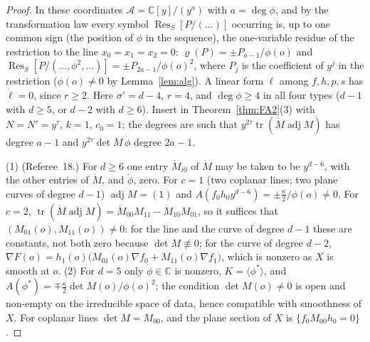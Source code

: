 \documentclass[11pt]{article}
\numberwithin{equation}{section}
\theoremstyle{remark}
\newcommand{\CC}{\mathbb{C}}
\newcommand{\cA}{\mathcal{A}}
\newcommand{\Res}{\operatorname{Res}}
\begin{document}
\begin{proof}
In these coordinates $\cA=\CC[y]/(y^a)$ with $a=\deg\phi$, and by the transformation law every symbol
$\Res_S[P/(\dots)]$ occurring is, up to one common sign (the position of $\phi$ in the sequence), the
one-variable residue of the restriction to the line $x_0=x_1=x_2=0$: $\varrho(P)=\pm P_{a-1}/\phi(o)$
and $\Res_S[P/(\dots,\phi^2,\dots)]=\pm P_{2a-1}/\phi(o)^2$, where $P_j$ is the coefficient of $y^j$ in the
restriction ($\phi(o)\ne0$ by Lemma~\ref{lem:alg}). A linear form $\ell$ among $f,h,p,s$ has $\dot\ell=0$, since
$r\ge2$. Here $\sigma'=d-4$, $r=4$, and $\deg\phi\ge4$ in all four types ($d-1$ with $d\ge5$, or $d-2$ with
$d\ge6$). Insert in Theorem~\ref{thm:FA2}(3) with $N=N'=y^\tau$, $k=1$, $c_0=1$; the degrees are such that
$y^{2\tau}\operatorname{tr}(\dot M\operatorname{adj}M)$ has degree $a-1$ and $y^{2\tau}\det M\,\dot\phi$ degree $2a-1$.

(1) (Referee~18.) For $d\ge6$ one entry $\dot M_{i0}$ of $\dot M$ may be taken to be $y^{d-6}$, with the other
entries of $\dot M$, and $\dot\phi$, zero. For $c=1$ (two coplanar lines; two plane curves of degree $d-1$)
$\operatorname{adj}M=(1)$ and $A(f_0h_0y^{d-6})=\pm\frac\kappa2/\phi(o)\ne0$. For $c=2$,
$\operatorname{tr}(\dot M\operatorname{adj}M)=\dot M_{00}M_{11}-\dot M_{10}M_{01}$, so it suffices that
$(M_{01}(o),M_{11}(o))\ne0$: for the line and the curve of degree $d-1$ these are constants, not both zero
because $\det M\not\equiv0$; for the curve of degree $d-2$, $\nabla F(o)=h_1(o)\bigl(M_{01}(o)\nabla f_0+M_{11}(o)\nabla f_1\bigr)$,
which is nonzero as $X$ is smooth at $o$. (2) For $d=5$ only $\dot\phi\in\CC$ is nonzero, $K=\langle\phi^*\rangle$,
and $A(\phi^*)=\mp\frac\kappa2\det M(o)/\phi(o)^2$; the condition $\det M(o)\ne0$ is open and non-empty on the
irreducible space of data, hence compatible with smoothness of $X$. For coplanar lines $\det M=M_{00}$, and the
plane section of $X$ is $\{f_0M_{00}h_0=0\}$.
\end{proof}
\end{document}
